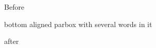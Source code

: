 \documentclass[12pt]{article}
\begin{document}
Before \parbox[b]{3cm}{bottom aligned parbox with several words in it} after
\end{document}
